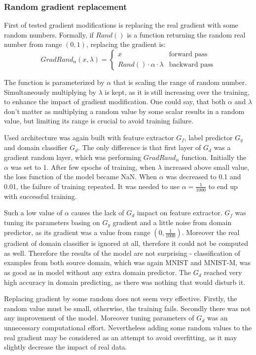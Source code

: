 \documentclass{article}
\begin{document}
\subsubsection{Random gradient replacement}
First of tested gradient modifications is replacing the real gradient with some random numbers. Formally, if $Rand()$ is a function returning the random real number from range $(0,1)$, replacing the gradient is:
\begin{equation*}
GradRand_{\alpha}(x, \lambda) = \begin{cases}
x &\text{forward pass}\\
Rand() \cdot \alpha \cdot \lambda &\text{backward pass}
\end{cases}
\end{equation*}
\par
The function is parameterized by $\alpha$ that is scaling the range of random number. Simultaneously multiplying by $\lambda$ is kept, as it is still increasing over the training, to enhance the impact of gradient modification. One could say, that both $\alpha$ and $\lambda$ don't matter as multiplying a random value by some scalar results in a random value, but limiting its range is crucial to avoid training failure.
\par
Used architecture was again built with feature extractor $G_{f}$, label predictor $G_{y}$ and domain classifier $G_{d}$. The only difference is that first layer of $G_{d}$ was a gradient random layer, which was performing $GradRand_{\alpha}$ function. Initially the $\alpha$ was set to 1. After few epochs of training, when $\lambda$ increased above small value, the loss function of the model became NaN. When $\alpha$ was decreased to 0.1 and 0.01, the failure of training repeated. It was needed to use $\alpha = \frac{1}{1000}$ to end up with successful training.
\par
Such a low value of $\alpha$ causes the lack of $G_{d}$ impact on feature extractor. $G_{f}$ was tuning its parameters basing on $G_{y}$ gradient and a little noise from domain predictor, as its gradient was a value from range $(0, \frac{1}{1000})$. Moreover the real gradient of domain classifier is ignored at all, therefore it could not be computed as well. Therefore the results of the model are not surprising - classification of examples from both source domain, which was again MNIST and MNIST-M, was as good as in model without any extra domain predictor. The $G_{d}$ reached very high accuracy in domain predicting, as there was nothing that would disturb it.
\par
Replacing gradient by some random does not seem very effective. Firstly, the random value must be small, otherwise, the training fails. Secondly there was not any improvement of the model. Moreover tuning parameters of $G_{d}$ was an unnecessary computational effort. Nevertheless adding some random values to the real gradient may be considered as an attempt to avoid overfitting, as it may slightly decrease the impact of real data.
\end{document}
